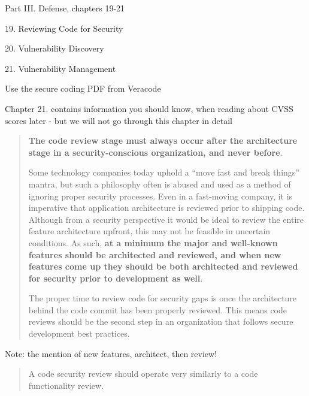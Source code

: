 \documentclass[Screen16to9,17pt]{foils}
\begin{document}
\begin{list1}
\item Part III. Defense, chapters 19-21
\item 19. Reviewing Code for Security
\item 20. Vulnerability Discovery
\item 21. Vulnerability Management
\item Use the secure coding PDF from Veracode
\end{list1}

Chapter 21. contains information you should know, when reading about CVSS scores later - but we will not go through this chapter in detail



\begin{quote} {\bf
The code review stage must always occur after the architecture stage in a security-conscious organization, and never before}.

Some technology companies today uphold a “move fast and break things” mantra, but such a philosophy often is abused and used as a method of ignoring proper security processes. Even in a fast-moving company, it is imperative that application architecture is reviewed prior to shipping code. Although from a security perspective it would be ideal to review the entire feature architecture upfront, this may not be feasible in uncertain conditions. As such, {\bf at a minimum the major and well-known features should be architected and reviewed, and when new features come up they should be both architected and reviewed for security prior to development as well}.

The proper time to review code for security gaps is once the architecture behind the code commit has been properly reviewed. This means code reviews should be the second step in an organization that follows secure development best practices.
\end{quote}

\begin{list2}
\item Note: the mention of new features, architect, then review!
\end{list2}




\begin{quote}
A code security review should operate very similarly to a code functionality review.
\end{quote}
\end{document}

